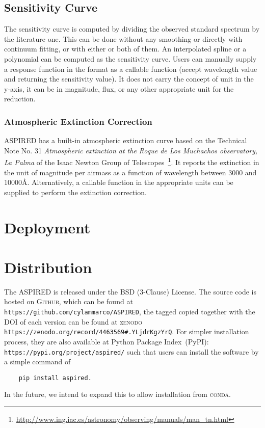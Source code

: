 \documentclass[fleqn,usenatbib]{mnras}
\begin{document}
\subsection*{Sensitivity Curve}
The sensitivity curve is computed by dividing the observed standard
spectrum by the literature one. This can be done without any smoothing
or directly with continuum fitting, or with either or both of them.
An interpolated spline or a polynomial can be computed as the
sensitivity curve. Users can manually supply a response function in
the format as a callable function (accept wavelength value and returning the
sensitivity value). It does not carry the concept of unit in the y-axis,
it can be in magnitude, flux, or any other appropriate unit for the
reduction.

\subsubsection*{Atmospheric Extinction Correction}
\textsc{ASPIRED} has a built-in atmospheric extinction curve based on
the Technical Note No. 31 \textit{Atmospheric extinction at the Roque
de Los Muchachos observatory, La Palma} of the Isaac Newton Group of
Telescopes~\footnote{\url{http://www.ing.iac.es/astronomy/observing/manuals/man_tn.html}}.
It reports the extinction in the unit of magnitude per airmass as a
function of wavelength between 3000 and 10000\AA. Alternatively,
a callable function in the appropriate units can be supplied to
perform the extinction correction.

\section{Deployment}



\section{Distribution}
The \textsc{ASPIRED} is released under the BSD (3-Clause) License. The
source code is hosted on \textsc{Github}, which can be found at
\verb+https://github.com/cylammarco/ASPIRED+, the tagged copied together
with the DOI of each version can be found at
\textsc{zenodo} \verb+https://zenodo.org/record/4463569#.YLjdrKgzYrQ+.
For simpler installation process, they are also available at Python
Package Index~(PyPI): \verb+https://pypi.org/project/aspired/+ such that
users can install the software by a simple command of 
\begin{verbatim}
    pip install aspired.
\end{verbatim}
In the future, we intend to expand this to allow installation from
\textsc{conda}.
\end{document}
